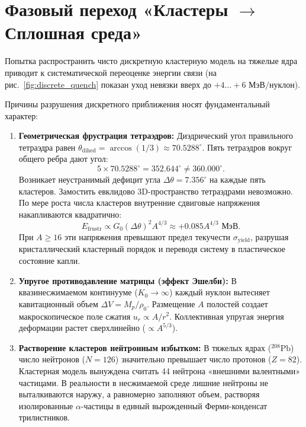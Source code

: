 \documentclass[11pt,a4paper]{article}
\theoremstyle{definition}
\theoremstyle{remark}
\begin{document}
\section{Фазовый переход «Кластеры $\to$ Сплошная среда»}
Попытка распространить чисто дискретную кластерную модель на тяжелые ядра приводит к систематической переоценке энергии связи (на рис.~\ref{fig:discrete_quench} показан уход невязки вверх до $+4\dots +6\text{ МэВ/нуклон}$). 

Причины разрушения дискретного приближения носят фундаментальный характер:
\begin{enumerate}
    \item \textbf{Геометрическая фрустрация тетраэдров:}
    Диэдрический угол правильного тетраэдра равен $\theta_{\mathrm{dihed}} = \arccos(1/3) \approx 70.5288^\circ$. Пять тетраэдров вокруг общего ребра дают угол:
    \begin{equation}
        5 \times 70.5288^\circ = 352.644^\circ \ne 360.000^\circ.
    \end{equation}
    Возникает неустранимый дефицит угла $\Delta\theta = 7.356^\circ$ на каждые пять кластеров. Замостить евклидово 3D-пространство тетраэдрами невозможно. По мере роста числа кластеров внутренние сдвиговые напряжения накапливаются квадратично:
    \begin{equation}
        E_{\mathrm{frustr}} \propto G_0 \left(\Delta\theta\right)^2 A^{4/3} \approx +0.085 A^{4/3}\text{ МэВ}.
    \end{equation}
    При $A \ge 16$ эти напряжения превышают предел текучести $\sigma_{\mathrm{yield}}$, разрушая кристаллический кластерный порядок и переводя систему в пластическое состояние капли.
    
    \item \textbf{Упругое противодавление матрицы (эффект Эшелби):}
    В квазинесжимаемом континууме ($K_0 \to \infty$) каждый нуклон вытесняет кавитационный объем $\Delta V = M_p / \rho_0$. Размещение $A$ полостей создает макроскопическое поле сжатия $u_r \propto A / r^2$. Коллективная упругая энергия деформации растет сверхлинейно ($\propto A^{5/3}$).
    
    \item \textbf{Растворение кластеров нейтронным избытком:}
    В тяжелых ядрах ($^{208}\mathrm{Pb}$) число нейтронов ($N=126$) значительно превышает число протонов ($Z=82$). Кластерная модель вынуждена считать 44 нейтрона «внешними валентными» частицами. В реальности в несжимаемой среде лишние нейтроны не выталкиваются наружу, а равномерно заполняют объем, растворяя изолированные $\alpha$-частицы в единый вырожденный Ферми-конденсат трилистников.
\end{enumerate}
\end{document}
